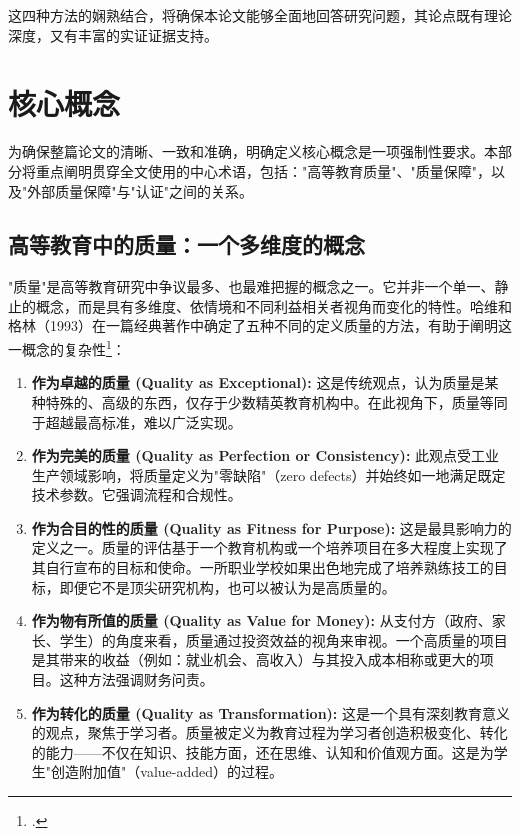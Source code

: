 这四种方法的娴熟结合，将确保本论文能够全面地回答研究问题，其论点既有理论深度，又有丰富的实证证据支持。



\section{核心概念}
\label{sec:khai_niem_cot_loi}

为确保整篇论文的清晰、一致和准确，明确定义核心概念是一项强制性要求。本部分将重点阐明贯穿全文使用的中心术语，包括："高等教育质量"、"质量保障"，以及"外部质量保障"与"认证"之间的关系。

\subsection{高等教育中的质量：一个多维度的概念}
\label{subsec:khai_niem_chat_luong}

"质量"是高等教育研究中争议最多、也最难把握的概念之一。它并非一个单一、静止的概念，而是具有多维度、依情境和不同利益相关者视角而变化的特性。哈维和格林（1993）在一篇经典著作中确定了五种不同的定义质量的方法，有助于阐明这一概念的复杂性\footcite{HarveyGreen1993}：

\begin{enumerate}
    \item \textbf{作为卓越的质量 (Quality as Exceptional):} 这是传统观点，认为质量是某种特殊的、高级的东西，仅存于少数精英教育机构中。在此视角下，质量等同于超越最高标准，难以广泛实现。
    
    \item \textbf{作为完美的质量 (Quality as Perfection or Consistency):} 此观点受工业生产领域影响，将质量定义为"零缺陷"（zero defects）并始终如一地满足既定技术参数。它强调流程和合规性。
    
    \item \textbf{作为合目的性的质量 (Quality as Fitness for Purpose):} 这是最具影响力的定义之一。质量的评估基于一个教育机构或一个培养项目在多大程度上实现了其自行宣布的目标和使命。一所职业学校如果出色地完成了培养熟练技工的目标，即便它不是顶尖研究机构，也可以被认为是高质量的。
    
    \item \textbf{作为物有所值的质量 (Quality as Value for Money):} 从支付方（政府、家长、学生）的角度来看，质量通过投资效益的视角来审视。一个高质量的项目是其带来的收益（例如：就业机会、高收入）与其投入成本相称或更大的项目。这种方法强调财务问责。
    
    \item \textbf{作为转化的质量 (Quality as Transformation):} 这是一个具有深刻教育意义的观点，聚焦于学习者。质量被定义为教育过程为学习者创造积极变化、转化的能力——不仅在知识、技能方面，还在思维、认知和价值观方面。这是为学生"创造附加值"（value-added）的过程。
\end{enumerate}

